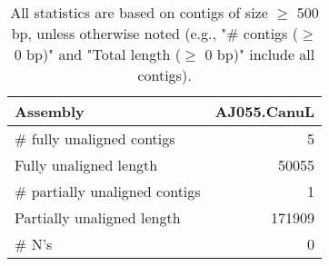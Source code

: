 \documentclass[12pt,a4paper]{article}
\begin{document}
\begin{table}[ht]
\begin{center}
\caption{All statistics are based on contigs of size $\geq$ 500 bp, unless otherwise noted (e.g., "\# contigs ($\geq$ 0 bp)" and "Total length ($\geq$ 0 bp)" include all contigs).}
\begin{tabular}{|l*{1}{|r}|}
\hline
Assembly & AJ055.CanuL \\ \hline
\# fully unaligned contigs & 5 \\ \hline
Fully unaligned length & 50055 \\ \hline
\# partially unaligned contigs & 1 \\ \hline
Partially unaligned length & 171909 \\ \hline
\# N's & 0 \\ \hline
\end{tabular}
\end{center}
\end{table}
\end{document}
